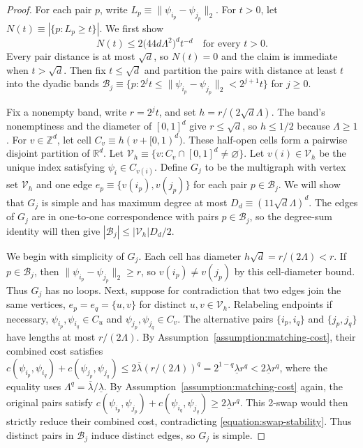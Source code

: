 \documentclass[letterpaper,12pt]{article}
\theoremstyle{definition}
\numberwithin{equation}{section}
\begin{document}
\begin{proof}
For each pair $p$, write $L_p\equiv\|\psi_{i_p}-\psi_{j_p}\|_2$.
For $t>0$, let $N(t)\equiv|\{p:L_p\geq t\}|$.
We first show
\begin{equation}\label{equation:proof-long-edge-count}
N(t) \leq 2\bigl(44d\Lambda^2\bigr)^d t^{-d} \quad \text{for every }t>0.
\end{equation}
Every pair distance is at most $\sqrt d$, so $N(t) = 0$ and the claim is immediate when $t>\sqrt d$.
Then fix $t\leq\sqrt d$ and partition the pairs with distance at least $t$ into the dyadic bands $\mathcal B_j\equiv\{p:2^jt\leq\|\psi_{i_p}-\psi_{j_p}\|_2<2^{j+1}t\}$ for $j\geq0$.

Fix a nonempty band, write $r=2^jt$, and set $h=r/(2\sqrt d\Lambda)$.
The band's nonemptiness and the diameter of $[0,1]^d$ give $r\leq\sqrt d$, so $h\leq1/2$ because $\Lambda\geq1$.
For $v\in\mathbb Z^d$, let cell $C_v\equiv h(v+[0,1)^d)$.
These half-open cells form a pairwise disjoint partition of $\mathbb R^d$.
Let $\mathcal V_h\equiv\{v:C_v\cap[0,1]^d\neq\varnothing\}$.
Let $v(i)\in\mathcal V_h$ be the unique index satisfying $\psi_i\in C_{v(i)}$.
Define $G_j$ to be the multigraph with vertex set $\mathcal V_h$ and one edge $e_p\equiv\{v(i_p),v(j_p)\}$ for each pair $p\in\mathcal B_j$.
We will show that $G_j$ is simple and has maximum degree at most $D_d\equiv(11\sqrt d\Lambda)^d$.
The edges of $G_j$ are in one-to-one correspondence with pairs $p\in\mathcal B_j$, so the degree-sum identity will then give $|\mathcal B_j|\leq|\mathcal V_h|D_d/2$.

We begin with simplicity of $G_j$.
Each cell has diameter $h\sqrt d=r/(2\Lambda)<r$.
If $p\in\mathcal B_j$, then $\|\psi_{i_p}-\psi_{j_p}\|_2\geq r$, so $v(i_p)\neq v(j_p)$ by this cell-diameter bound.
Thus $G_j$ has no loops.
Next, suppose for contradiction that two edges join the same vertices, $e_p=e_q=\{u,v\}$ for distinct $u,v\in\mathcal V_h$.
Relabeling endpoints if necessary, $\psi_{i_p},\psi_{i_q}\in C_u$ and $\psi_{j_p},\psi_{j_q}\in C_v$.
The alternative pairs $\{i_p,i_q\}$ and $\{j_p,j_q\}$ have lengths at most $r/(2\Lambda)$.
By Assumption~\ref{assumption:matching-cost}, their combined cost satisfies $c(\psi_{i_p},\psi_{i_q})+c(\psi_{j_p},\psi_{j_q})\leq2\overline\lambda(r/(2\Lambda))^q=2^{1-q}\underline\lambda r^q<2\underline\lambda r^q$, where the equality uses $\Lambda^q=\overline\lambda/\underline\lambda$.
By Assumption~\ref{assumption:matching-cost} again, the original pairs satisfy $c(\psi_{i_p},\psi_{j_p})+c(\psi_{i_q},\psi_{j_q})\geq2\underline\lambda r^q$.
This 2-swap would then strictly reduce their combined cost, contradicting \eqref{equation:swap-stability}.
Thus distinct pairs in $\mathcal B_j$ induce distinct edges, so $G_j$ is simple.


\end{proof}
\end{document}
